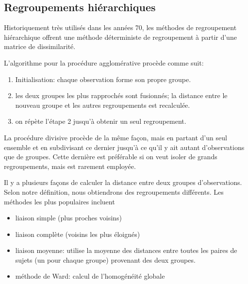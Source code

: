 \documentclass[
  11pt,
  letterpaper,
]{scrbook}
\providecommand{\tightlist}{%
  \setlength{\itemsep}{0pt}\setlength{\parskip}{0pt}}\usepackage{longtable,booktabs,array}
\theoremstyle{definition}
\theoremstyle{remark}
\begin{document}
\hypertarget{regroupements-hiuxe9rarchiques}{%
\subsection{Regroupements
hiérarchiques}\label{regroupements-hiuxe9rarchiques}}

Historiquement très utilisés dans les années 70, les méthodes de
regroupement hiérarchique offrent une méthode déterministe de
regroupement à partir d'une matrice de dissimilarité.

L'algorithme pour la procédure agglomérative procède comme suit:

\begin{enumerate}
\def\labelenumi{\arabic{enumi}.}
\tightlist
\item
  Initialisation: chaque observation forme son propre groupe.
\item
  les deux groupes les plus rapprochés sont fusionnés; la distance entre
  le nouveau groupe et les autres regroupements est recalculée.
\item
  on répète l'étape 2 jusqu'à obtenir un seul regroupement.
\end{enumerate}

La procédure divisive procède de la même façon, mais en partant d'un
seul ensemble et en subdivisant ce dernier jusqu'à ce qu'il y ait autant
d'observations que de groupes. Cette dernière est préférable si on veut
isoler de grands regroupements, mais est rarement employée.

Il y a plusieurs façons de calculer la distance entre deux groupes
d'observations. Selon notre définition, nous obtiendrons des
regroupements différents. Les méthodes les plus populaires incluent

\begin{itemize}
\tightlist
\item
  liaison simple (plus proches voisins)
\item
  liaison complète (voisins les plus éloignés)
\item
  liaison moyenne: utilise la moyenne des distances entre toutes les
  paires de sujets (un pour chaque groupe) provenant des deux groupes.
\item
  méthode de Ward: calcul de l'homogénéité globale
\end{itemize}
\end{document}
